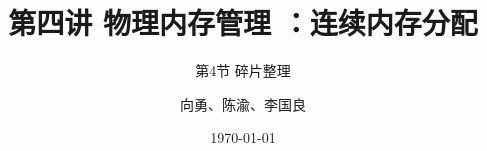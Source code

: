 


\title[第4讲]{第四讲 物理内存管理 ：连续内存分配} %
\subtitle{第4节 碎片整理}
\author{向勇、陈渝、李国良} %
\date{\today} %



\begin{frame}
\titlepage %
\end{frame}


